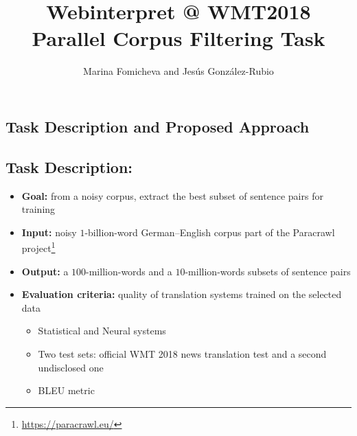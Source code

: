 \documentclass[a0]{sciposter}
\title{Webinterpret @ WMT2018\\Parallel Corpus Filtering Task}
\author{Marina Fomicheva and Jes\'{u}s Gonz\'{a}lez-Rubio}
\institute{AT Language Solutions$^*$ and Webinterpret\\\vspace*{-.45em}{\footnotesize $^*$Marina Fomicheva worked at Webinterpret at the time of preparation of this submission.}}
\begin{document}
\maketitle

\begin{multicols*}{2}



\section*{\Large Task Description and Proposed Approach}

\subsection*{Task Description:}
\begin{itemize}
  \item {\bf Goal:} from a noisy corpus, extract the best subset of sentence pairs for training
  \item {\bf Input:} noisy $1$-billion-word German--English corpus part of the Paracrawl project\footnote{\url{https://paracrawl.eu/}}
  \item {\bf Output:} a $100$-million-words and a $10$-million-words subsets of sentence pairs
  \item {\bf Evaluation criteria:} quality of translation systems trained on the selected data
  \begin{itemize}
    \item Statistical and Neural systems
    \item Two test sets: official WMT 2018 news translation test and a second undisclosed one
    \item BLEU metric
  \end{itemize}
\end{itemize}


\end{multicols*}
\end{document}
